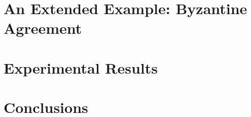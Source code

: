 \documentclass{IEEEtran/IEEEtran}
\newcommand{\lee}[1]{ } %
\newcommand{\lee}[1]{ {\color{blue}$<$lee: #1$>$} } %
\begin{document}
\section{An Extended Example: Byzantine Agreement}\label{sec:byz}

\section{Experimental Results}\label{sec:experimental}

\lee{let's also check out scalability when we ``turn off'' faults. Also, how hard is it to turn them off or change the fault model? E.g., how many lines of spec need to be changed? Compare to rushby's?}

\section{Conclusions}\label{sec:conclusions}



\end{document}
